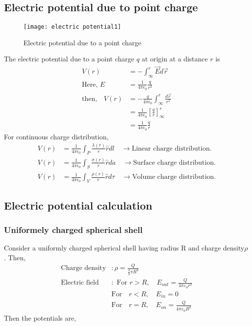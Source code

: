 \subsection{Electric potential due to point charge}
\begin{wrapfigure}{r}{0.40\textwidth}
	\begin{center}
		\texttt{[image: electric potential1]}
	\end{center}
	\caption{Electric potential due to a point charge}
\end{wrapfigure}
The electric potential due to a point charge $q$ at origin at a distance $r$ is
\begin{align*}
V(r)&=-\int_{\infty}^{r} \vec{E} d \vec{r}\\
\text{Here, }E&=\frac{1}{4\pi \epsilon_{0}}\frac{q}{r^{2}}\\
\text{then,}\quad  V(r)&=- \frac{q}{4\pi \epsilon_{0}}\int_{\infty}^{r} 
\frac{ d \vec{r}}{r^{2}}\\
&=\frac{1}{4\pi \epsilon_{0}}\left[ \frac{q}{r} \right]_{\infty}^{r}\\
&=\frac{1}{4\pi \epsilon_{0}} \frac{q}{r} 
\end{align*}
For continuous charge distribution,
\begin{align*}
{V}({r})&=\frac{1}{4 \pi \epsilon_{0}} \int_{{P}} \frac{\lambda\left({r}\right)}{r} \hat{{r}} d l\quad\rightarrow \text{Linear charge distribution.}\\
{V}({r})&=\frac{1}{4 \pi \epsilon_{0}} \int_{{S}} \frac{\sigma\left({r}\right)}{r} \hat{{r}} d a\quad\rightarrow \text{Surface charge distribution.}\\
{V}({r})&=\frac{1}{4 \pi \epsilon_{0}} \int_{{V}} \frac{\rho\left({r}\right)}{r} \hat{r} d \tau\quad \rightarrow \text{Volume charge distribution.}
\end{align*}



\subsection{Electric potential calculation}

\subsubsection{Uniformely charged spherical shell}
Consider a uniformly charged spherical shell having radius $\mathrm{R}$ and charge density$\rho$. Then,\\
\begin{align*}
\text{Charge density}&:\rho=\frac{Q}{\frac{4}{3} \pi R^{3}}\\
\text{Electric field}&:\text { For } r>R , \quad E_{out}=\frac{Q}{4 \pi \varepsilon_{0} r^{2}}
\\&\text {For}\quad r<R, \quad E_{in}=0
\\&\text {For}\quad r=R, \quad E_{on}=\frac{Q}{4 \pi \varepsilon_{0} R^{2}}
\end{align*}
Then the potentials are,

